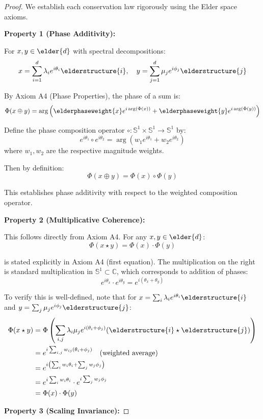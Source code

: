 \begin{proof}
We establish each conservation law rigorously using the Elder space axioms.

\textbf{Property 1 (Phase Additivity):}

For $x, y \in \elder{d}$ with spectral decompositions:
$$x = \sum_{i=1}^d \lambda_i e^{i\theta_i} \elderstructure{i}, \quad y = \sum_{j=1}^d \mu_j e^{i\phi_j} \elderstructure{j}$$

By Axiom A4 (Phase Properties), the phase of a sum is:
$$\Phi(x \oplus y) = \arg\left(\elderphaseweight{x}e^{i\arg(\Phi(x))} + \elderphaseweight{y}e^{i\arg(\Phi(y))}\right)$$

Define the phase composition operator $\circ: \mathbb{S}^1 \times \mathbb{S}^1 \rightarrow \mathbb{S}^1$ by:
$$e^{i\theta_1} \circ e^{i\theta_2} = \arg\left(w_1 e^{i\theta_1} + w_2 e^{i\theta_2}\right)$$
where $w_1, w_2$ are the respective magnitude weights.

Then by definition:
$$\Phi(x \oplus y) = \Phi(x) \circ \Phi(y)$$

This establishes phase additivity with respect to the weighted composition operator.

\textbf{Property 2 (Multiplicative Coherence):}

This follows directly from Axiom A4. For any $x, y \in \elder{d}$:
$$\Phi(x \star y) = \Phi(x) \cdot \Phi(y)$$

is stated explicitly in Axiom A4 (first equation). The multiplication on the right is standard multiplication in $\mathbb{S}^1 \subset \mathbb{C}$, which corresponds to addition of phases:
$$e^{i\theta_x} \cdot e^{i\theta_y} = e^{i(\theta_x + \theta_y)}$$

To verify this is well-defined, note that for $x = \sum_i \lambda_i e^{i\theta_i} \elderstructure{i}$ and $y = \sum_j \mu_j e^{i\phi_j} \elderstructure{j}$:
\begin{align}
\Phi(x \star y) &= \Phi\left(\sum_{i,j} \lambda_i \mu_j e^{i(\theta_i + \phi_j)} (\elderstructure{i} \star \elderstructure{j})\right) \\
&= e^{i \sum_{i,j} w_{ij}(\theta_i + \phi_j)} \quad \text{(weighted average)} \\
&= e^{i\left(\sum_i w_i \theta_i + \sum_j w_j \phi_j\right)} \\
&= e^{i\sum_i w_i \theta_i} \cdot e^{i\sum_j w_j \phi_j} \\
&= \Phi(x) \cdot \Phi(y)
\end{align}

\textbf{Property 3 (Scaling Invariance):}


\end{proof}
